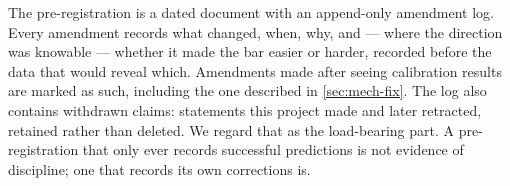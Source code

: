 The pre-registration is a dated document with an append-only amendment log. Every amendment
records what changed, when, why, and --- where the direction was knowable --- whether it made the
bar easier or harder, recorded before the data that would reveal which. Amendments made after
seeing calibration results are marked as such, including the one described in
\cref{sec:mech-fix}. The log also contains withdrawn claims: statements this project made and
later retracted, retained rather than deleted. We regard that as the load-bearing part. A
pre-registration that only ever records successful predictions is not evidence of discipline; one
that records its own corrections is.
